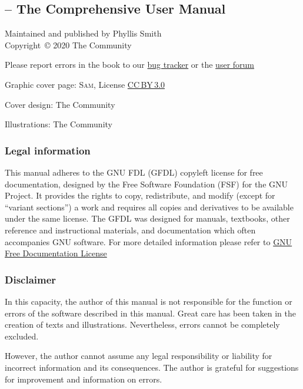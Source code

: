 %
\begingroup %
\setlength{\parskip}{0.4\baselineskip}
\subsection*{\sffamily\CGG{} -- The Comprehensive User Manual}
\label{sec:Impressum}
%
%
Maintained and published by Phyllis Smith\\[+1.2em]
Copyright~\copyright{} 2020 The \CGG{} Community\par
Please report errors in the book to our \href{https://www.cinelerra-gg.org/bugtracker/}{bug tracker} or the \href{https://www.cinelerra-gg.org/forum/}{user forum}\par
Graphic cover page: \textsc{Sam}, License
\textsc{\href{https://creativecommons.org/licenses/by/3.0/}{CC\,BY\,3.0}}\par
Cover design: The \CGG{} Community\par
Illustrations: The \CGG{} Community%
\bigskip%

\footnotesize
\subsubsection*{\sffamily{}Legal information}
\label{sec:Legal-information}
This manual adheres to the GNU FDL (GFDL) copyleft license for free documentation,
designed by the Free Software Foundation (FSF) for the GNU Project. It provides the
rights to copy, redistribute, and modify (except for ``variant sections'') a work
and requires all copies and derivatives to be available under the same license.
The GFDL was designed for manuals, textbooks, other reference and instructional
materials, and documentation which often accompanies GNU software. For more
detailed information please refer to
\href{https://www.gnu.org/licenses/fdl-1.3.en.html}{GNU Free Documentation License}

\subsubsection*{\sffamily{}Disclaimer}
\label{sec:Disclaimer}
%
%
In this capacity, the author of this manual is not responsible for
the function or errors of the software described in this
manual. Great care has been taken in the creation of texts and
illustrations. Nevertheless, errors cannot be completely
excluded.\par
However, the author cannot assume any legal responsibility or
liability for incorrect information and its consequences. The author
is grateful for suggestions for improvement and information on
errors.


